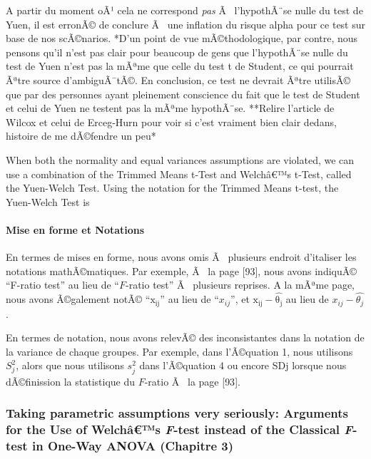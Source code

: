 \begin{appendix}
A partir du moment oÃ¹ cela ne correspond \emph{pas} Ã~ l'hypothÃ¨se
nulle du test de Yuen, il est erronÃ© de conclure Ã~ une inflation du
risque alpha pour ce test sur base de nos scÃ©narios. *D'un point de vue
mÃ©thodologique, par contre, nous pensons qu'il n'est pas clair pour
beaucoup de gens que l'hypothÃ¨se nulle du test de Yuen n'est pas la
mÃªme que celle du test t de Student, ce qui pourrait Ãªtre source
d'ambiguÃ¯tÃ©. En conclusion, ce test ne devrait Ãªtre utilisÃ© que par
des personnes ayant pleinement conscience du fait que le test de Student
et celui de Yuen ne testent pas la mÃªme hypothÃ¨se. **Relire l'article
de Wilcox et celui de Erceg-Hurn pour voir si c'est vraiment bien clair
dedans, histoire de me dÃ©fendre un peu*

When both the normality and equal variances assumptions are violated, we
can use a combination of the Trimmed Means t-Test and Welchâ€™s t-Test,
called the Yuen-Welch Test. Using the notation for the Trimmed Means
t-test, the Yuen-Welch Test is

\hypertarget{mise-en-forme-et-notations}{%
\paragraph{Mise en forme et
Notations}\label{mise-en-forme-et-notations}}

En termes de mises en forme, nous avons omis Ã~ plusieurs endroit
d'italiser les notations mathÃ©matiques. Par exemple, Ã~ la page
{[}93{]}, nous avons indiquÃ© ``F-ratio test'' au lieu de ``\(F\)-ratio
test'' Ã~ plusieurs reprises. A la mÃªme page, nous avons Ã©galement
notÃ© ``\(\mathrm{x_{ij}}\)'' au lieu de ``\(x_{ij}\)'', et
\textbar{}\(\mathrm{x_{ij}-\hat{\theta_j}}\)\textbar{} au lieu de
\textbar{}\(x_{ij}-\hat{\theta_j}\)\textbar.

En termes de notation, nous avons relevÃ© des inconsistantes dans la
notation de la variance de chaque groupes. Par exemple, dans l'Ã©quation
1, nous utilisons \(S^2_j\), alors que nous utilisons \(s^2_j\) dans
l'Ã©quation 4 ou encore SDj lorsque nous dÃ©finission la statistique du
\(F\)-ratio Ã~ la page {[}93{]}.

\hypertarget{taking-parametric-assumptions-very-seriously-arguments-for-the-use-of-welchuxe2s-f-test-instead-of-the-classical-f-test-in-one-way-anova-chapitre-3}{%
\subsubsection{\texorpdfstring{Taking parametric assumptions very
seriously: Arguments for the Use of Welchâ€™s \emph{F}-test instead of
the Classical \emph{F}-test in One-Way ANOVA (Chapitre
3)}{Taking parametric assumptions very seriously: Arguments for the Use of Welchâ€™s F-test instead of the Classical F-test in One-Way ANOVA (Chapitre 3)}}\label{taking-parametric-assumptions-very-seriously-arguments-for-the-use-of-welchuxe2s-f-test-instead-of-the-classical-f-test-in-one-way-anova-chapitre-3}}


\end{appendix}
